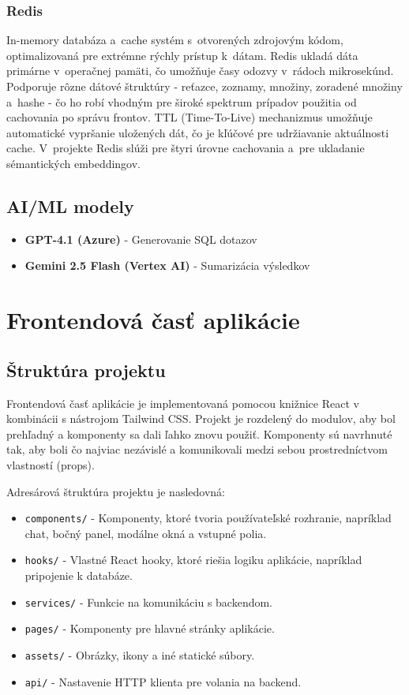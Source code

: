 \documentclass[a4paper, 12pt]{article}
\begin{document}
\subsubsection*{Redis}

In-memory databáza a~cache systém s~otvorených zdrojovým kódom, optimalizovaná pre extrémne rýchly prístup k~dátam. Redis ukladá dáta primárne v~operačnej pamäti, čo umožňuje časy odozvy v~rádoch mikrosekúnd. Podporuje rôzne dátové štruktúry - reťazce, zoznamy, množiny, zoradené množiny a~hashe - čo ho robí vhodným pre široké spektrum prípadov použitia od cachovania po správu frontov. TTL (Time-To-Live) mechanizmus umožňuje automatické vypršanie uložených dát, čo je kľúčové pre udržiavanie aktuálnosti cache. V~projekte Redis slúži pre štyri úrovne cachovania a~pre ukladanie sémantických embeddingov.

\subsection{AI/ML modely}

\begin{itemize}
    \item \textbf{GPT-4.1 (Azure)} - Generovanie SQL dotazov
    \item \textbf{Gemini 2.5 Flash (Vertex AI)} - Sumarizácia výsledkov
\end{itemize}

\clearpage

\section{Frontendová časť aplikácie}

\subsection{Štruktúra projektu}

Frontendová časť aplikácie je implementovaná pomocou knižnice React v kombinácii s nástrojom Tailwind CSS. Projekt je rozdelený do modulov, aby bol prehľadný a komponenty sa dali ľahko znovu použiť. Komponenty sú navrhnuté tak, aby boli čo najviac nezávislé a komunikovali medzi sebou prostredníctvom vlastností (props).

Adresárová štruktúra projektu je nasledovná:

\begin{itemize}
    \item \texttt{components/} - Komponenty, ktoré tvoria používateľské rozhranie, napríklad chat, bočný panel, modálne okná a vstupné polia.
    \item \texttt{hooks/} - Vlastné React hooky, ktoré riešia logiku aplikácie, napríklad pripojenie k databáze.
    \item \texttt{services/} - Funkcie na komunikáciu s backendom.
    \item \texttt{pages/} - Komponenty pre hlavné stránky aplikácie.
    \item \texttt{assets/} - Obrázky, ikony a iné statické súbory.
    \item \texttt{api/} - Nastavenie HTTP klienta pre volania na backend.
\end{itemize}
\end{document}
